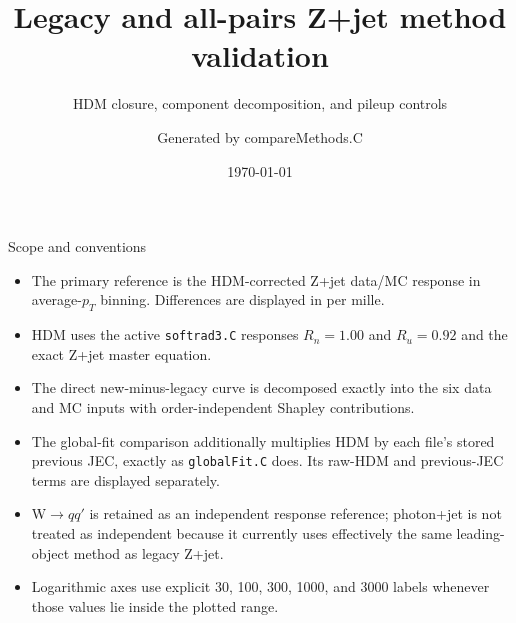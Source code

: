 \documentclass[aspectratio=169,9pt]{beamer}
\title{Legacy and all-pairs Z+jet method validation}
\subtitle{HDM closure, component decomposition, and pileup controls}
\author{Generated by compareMethods.C}
\date{\today}
\begin{document}
\begin{frame}
  \titlepage
\end{frame}

\begin{frame}{Scope and conventions}
  \begin{itemize}
    \item The primary reference is the HDM-corrected Z+jet data/MC response in
          average-$p_T$ binning. Differences are displayed in per mille.
    \item HDM uses the active \texttt{softrad3.C} responses $R_n=1.00$ and
          $R_u=0.92$ and the exact Z+jet master equation.
    \item The direct new-minus-legacy curve is decomposed exactly into the six
          data and MC inputs with order-independent Shapley contributions.
    \item The global-fit comparison additionally multiplies HDM by each file's
          stored previous JEC, exactly as \texttt{globalFit.C} does. Its
          raw-HDM and previous-JEC terms are displayed separately.
    \item W$\rightarrow qq'$ is retained as an independent response reference;
          photon+jet is not treated as independent because it currently uses
          effectively the same leading-object method as legacy Z+jet.
    \item Logarithmic axes use explicit 30, 100, 300, 1000, and 3000 labels
          whenever those values lie inside the plotted range.
  \end{itemize}
\end{frame}


\end{document}
